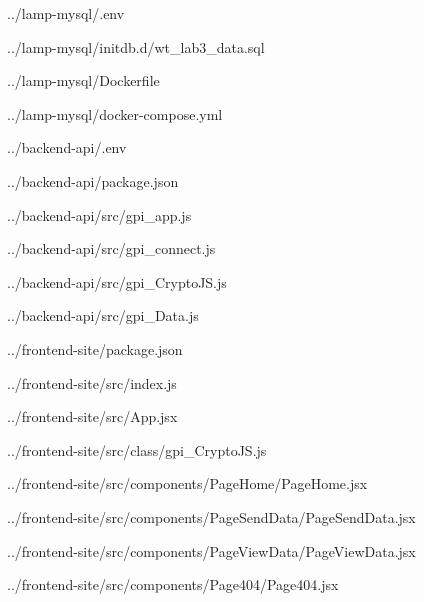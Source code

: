 

{../lamp-mysql/.env}


{../lamp-mysql/initdb.d/wt_lab3_data.sql}


{../lamp-mysql/Dockerfile}


{../lamp-mysql/docker-compose.yml}



{../backend-api/.env}


{../backend-api/package.json}


{../backend-api/src/gpi_app.js}


{../backend-api/src/gpi_connect.js}


{../backend-api/src/gpi_CryptoJS.js}


{../backend-api/src/gpi_Data.js}



{../frontend-site/package.json}


{../frontend-site/src/index.js}


{../frontend-site/src/App.jsx}


{../frontend-site/src/class/gpi_CryptoJS.js}


{../frontend-site/src/components/PageHome/PageHome.jsx}


{../frontend-site/src/components/PageSendData/PageSendData.jsx}


{../frontend-site/src/components/PageViewData/PageViewData.jsx}


{../frontend-site/src/components/Page404/Page404.jsx}
